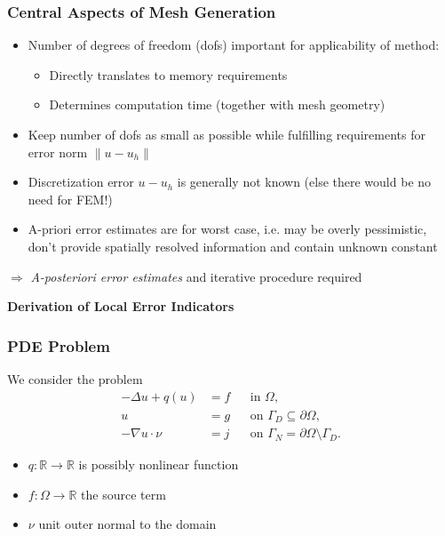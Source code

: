 \documentclass[ignorenonframetext,11pt]{beamer}
\theoremstyle{definition}
\begin{document}
\begin{frame}
\frametitle{Central Aspects of Mesh Generation}
\begin{itemize}
  \item Number of degrees of freedom (dofs) important for applicability of method:
    \begin{itemize}
      \item Directly translates to memory requirements
      \item Determines computation time (together with mesh geometry)
    \end{itemize}
  \item Keep number of dofs as small as possible while fulfilling requirements for
    error norm $\| u - u_h \|$
  \item Discretization error $u - u_h$ is generally not known (else there would be
    no need for FEM!)
  \item A-priori error estimates are for worst case, i.e. may be overly pessimistic,
    don't provide spatially resolved information and contain unknown constant
\end{itemize}
$\Rightarrow$ \emph{A-posteriori error estimates} and iterative procedure required
\end{frame}

\begin{frame}
\begin{center}
\Large\textbf{Derivation of Local Error Indicators}
\end{center}
\end{frame}


\begin{frame}
\frametitle{PDE Problem}
We consider the problem
\begin{subequations} \label{eq:ProblemStrong}
\begin{align*}
-\Delta u + q(u) &= f &&\text{in $\Omega$},\\
u &= g &&\text{on $\Gamma_D\subseteq\partial\Omega$},\\
-\nabla u\cdot \nu &= j &&\text{on $\Gamma_N=\partial\Omega\setminus\Gamma_D$}.
\end{align*}
\end{subequations}
\begin{itemize}
\item $q:\mathbb{R}\to\mathbb{R}$ is possibly
nonlinear function
\item $f: \Omega\to\mathbb{R}$ the source term
\item $\nu$ unit outer normal to the domain
\end{itemize}
\end{frame}
\end{document}
